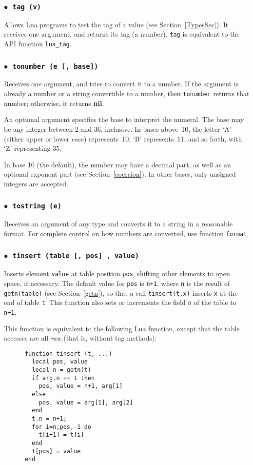 \documentclass[11pt]{article}
\newcommand{\See}[1]{Section~\ref{#1}}
\newcommand{\see}[1]{(see \See{#1})}
\newcommand{\T}[1]{{\tt #1}}
\newcommand{\nil}{{\bf nil}}
\newcommand{\Deffunc}[1]{\index{#1}}
\newcommand{\ff}{$\bullet$\ }
\begin{document}
\subsubsection*{\ff \T{tag (v)}}\Deffunc{tag}\label{pdf-tag}
Allows Lua programs to test the tag of a value \see{TypesSec}.
It receives one argument, and returns its tag (a number).
\verb|tag| is equivalent to the API function \verb|lua_tag|.

\subsubsection*{\ff \T{tonumber (e [, base])}}\Deffunc{tonumber}
Receives one argument,
and tries to convert it to a number.
If the argument is already a number or a string convertible
to a number, then \verb|tonumber| returns that number;
otherwise, it returns \nil.

An optional argument specifies the base to interpret the numeral.
The base may be any integer between 2 and 36, inclusive.
In bases above~10, the letter `A' (either upper or lower case)
represents~10, `B' represents~11, and so forth, with `Z' representing 35.

In base 10 (the default), the number may have a decimal part,
as well as an optional exponent part \see{coercion}.
In other bases, only unsigned integers are accepted.

\subsubsection*{\ff \T{tostring (e)}}\Deffunc{tostring}
Receives an argument of any type and
converts it to a string in a reasonable format.
For complete control on how numbers are converted,
use function \verb|format|.



\subsubsection*{\ff \T{tinsert (table [, pos] , value)}}\Deffunc{tinsert}

Inserts element \verb|value| at table position \verb|pos|,
shifting other elements to open space, if necessary.
The default value for \verb|pos| is \verb|n+1|,
where \verb|n| is the result of \verb|getn(table)| \see{getn},
so that a call \verb|tinsert(t,x)| inserts \verb|x| at the end
of table \verb|t|.
This function also sets or increments the field \verb|n| of the table
to \verb|n+1|.

This function is equivalent to the following Lua function,
except that the table accesses are all \emph{raw} (that is, without tag methods):
\begin{verbatim}
      function tinsert (t, ...)
        local pos, value
        local n = getn(t)
        if arg.n == 1 then
          pos, value = n+1, arg[1]
        else
          pos, value = arg[1], arg[2]
        end
        t.n = n+1;
        for i=n,pos,-1 do
          t[i+1] = t[i]
        end
        t[pos] = value
      end
\end{verbatim}
\end{document}
